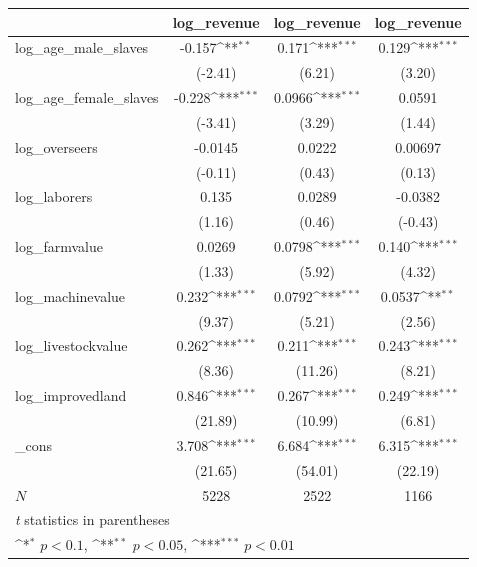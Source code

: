 {
\def\sym#1{\ifmmode^{#1}\else\(^{#1}\)\fi}
\begin{tabular}{l*{3}{c}}
\hline\hline
            &\multicolumn{1}{c}{log\_revenue}&\multicolumn{1}{c}{log\_revenue}&\multicolumn{1}{c}{log\_revenue}\\
\hline
log\_age\_male\_slaves&      -0.157\sym{**} &       0.171\sym{***}&       0.129\sym{***}\\
            &     (-2.41)         &      (6.21)         &      (3.20)         \\
[1em]
log\_age\_female\_slaves&      -0.228\sym{***}&      0.0966\sym{***}&      0.0591         \\
            &     (-3.41)         &      (3.29)         &      (1.44)         \\
[1em]
log\_overseers&     -0.0145         &      0.0222         &     0.00697         \\
            &     (-0.11)         &      (0.43)         &      (0.13)         \\
[1em]
log\_laborers&       0.135         &      0.0289         &     -0.0382         \\
            &      (1.16)         &      (0.46)         &     (-0.43)         \\
[1em]
log\_farmvalue&      0.0269         &      0.0798\sym{***}&       0.140\sym{***}\\
            &      (1.33)         &      (5.92)         &      (4.32)         \\
[1em]
log\_machinevalue&       0.232\sym{***}&      0.0792\sym{***}&      0.0537\sym{**} \\
            &      (9.37)         &      (5.21)         &      (2.56)         \\
[1em]
log\_livestockvalue&       0.262\sym{***}&       0.211\sym{***}&       0.243\sym{***}\\
            &      (8.36)         &     (11.26)         &      (8.21)         \\
[1em]
log\_improvedland&       0.846\sym{***}&       0.267\sym{***}&       0.249\sym{***}\\
            &     (21.89)         &     (10.99)         &      (6.81)         \\
[1em]
\_cons      &       3.708\sym{***}&       6.684\sym{***}&       6.315\sym{***}\\
            &     (21.65)         &     (54.01)         &     (22.19)         \\
\hline
\(N\)       &        5228         &        2522         &        1166         \\
\hline\hline
\multicolumn{4}{l}{\footnotesize \textit{t} statistics in parentheses}\\
\multicolumn{4}{l}{\footnotesize \sym{*} \(p<0.1\), \sym{**} \(p<0.05\), \sym{***} \(p<0.01\)}\\
\end{tabular}
}
